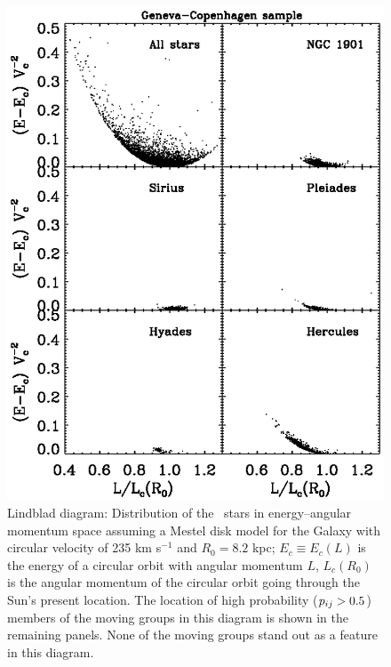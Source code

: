 \clearpage
\begin{figure}
\includegraphics{figs_groups/sellwood_gcs_mg.ps}
\caption[Lindblad diagram: Distribution of the \gcsabb\ stars in
  energy--angular momentum space assuming a Mestel disk model for the
  Galaxy]{Lindblad diagram: Distribution of the \gcsabb\ stars in
  energy--angular momentum space assuming a Mestel disk model for the
  Galaxy with circular velocity of 235 km s$^{-1}$ and $R_0 = 8.2$
  kpc; $E_c \equiv E_c(L)$ is the energy of a circular orbit with
  angular momentum $L$, $L_c(R_0)$ is the angular momentum of the
  circular orbit going through the Sun's present location. The
  location of high probability ($p_{ij} > 0.5$) members of the moving
  groups in this diagram is shown in the remaining panels. None of the
  moving groups stand out as a feature in this
  diagram.}\label{fig:sellwood}
\end{figure}


